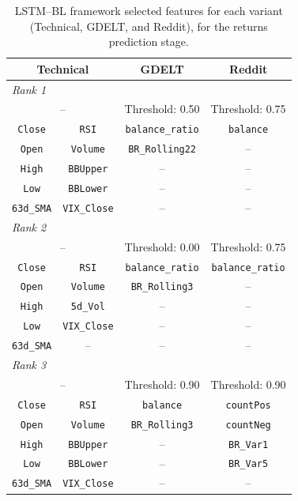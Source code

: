 \begin{table}[ht]
\centering
\caption{LSTM--BL framework selected features for each variant (Technical, GDELT, and Reddit), for the returns prediction stage.}
\label{tab:lstmvreturns_features}
\renewcommand{\arraystretch}{1.2}
\begin{tabular}{|cc|c|c|}
\hline
\multicolumn{2}{|c|}{\textbf{Technical}} & \textbf{GDELT} & \textbf{Reddit} \\
\hline\hline
\multicolumn{4}{|l|}{\textit{Rank 1}} \\
\hline
\multicolumn{2}{|c|}{--} & Threshold: 0.50 & Threshold: 0.75 \\
\hline
\texttt{Close}  & \texttt{RSI}          & \texttt{balance\_ratio} & \texttt{balance} \\
\texttt{Open}   & \texttt{Volume}       & \texttt{BR\_Rolling22} & -- \\
\texttt{High}   & \texttt{BBUpper}      & -- & -- \\
\texttt{Low}    & \texttt{BBLower}      & -- & -- \\
\texttt{63d\_SMA}  & \texttt{VIX\_Close} & -- & -- \\
\hline\hline
\multicolumn{4}{|l|}{\textit{Rank 2}} \\
\hline
\multicolumn{2}{|c|}{--} & Threshold: 0.00 & Threshold: 0.75 \\
\hline
\texttt{Close} & \texttt{RSI} & \texttt{balance\_ratio} & \texttt{balance\_ratio} \\
\texttt{Open} & \texttt{Volume} & \texttt{BR\_Rolling3} & -- \\
\texttt{High} & \texttt{5d\_Vol} & -- & -- \\
\texttt{Low} & \texttt{VIX\_Close} & -- & -- \\
\texttt{63d\_SMA} & -- & -- & -- \\
\hline\hline
\multicolumn{4}{|l|}{\textit{Rank 3}} \\
\hline
\multicolumn{2}{|c|}{--} & Threshold: 0.90 & Threshold: 0.90 \\
\hline
\texttt{Close} & \texttt{RSI} & \texttt{balance} & \texttt{countPos} \\
\texttt{Open} & \texttt{Volume} & \texttt{BR\_Rolling3} & \texttt{countNeg} \\
\texttt{High} & \texttt{BBUpper} & -- & \texttt{BR\_Var1} \\
\texttt{Low} & \texttt{BBLower} & -- & \texttt{BR\_Var5} \\
\texttt{63d\_SMA} & \texttt{VIX\_Close} & -- & -- \\
\hline
\end{tabular}
\end{table}

